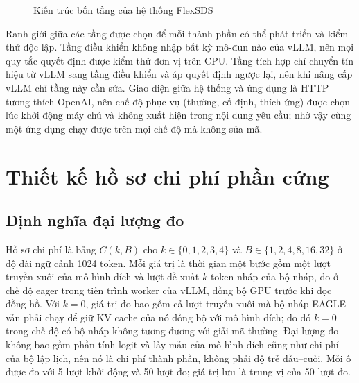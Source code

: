 \begin{figure}[htbp]
\caption{Kiến trúc bốn tầng của hệ thống FlexSDS}
\label{fig:kien-truc}
\end{figure}

Ranh giới giữa các tầng được chọn để mỗi thành phần có thể phát triển và kiểm thử độc lập. Tầng điều khiển không nhập bất kỳ mô-đun nào của vLLM, nên mọi quy tắc quyết định được kiểm thử đơn vị trên CPU. Tầng tích hợp chỉ chuyển tín hiệu từ vLLM sang tầng điều khiển và áp quyết định ngược lại, nên khi nâng cấp vLLM chỉ tầng này cần sửa. Giao diện giữa hệ thống và ứng dụng là HTTP tương thích OpenAI, nên chế độ phục vụ (thường, cố định, thích ứng) được chọn lúc khởi động máy chủ và không xuất hiện trong nội dung yêu cầu; nhờ vậy cùng một ứng dụng chạy được trên mọi chế độ mà không sửa mã.

\section{Thiết kế hồ sơ chi phí phần cứng}
\label{sec:ho-so}

\subsection{Định nghĩa đại lượng đo}

Hồ sơ chi phí là bảng $C(k, B)$ cho $k \in \{0, 1, 2, 3, 4\}$ và $B \in \{1, 2, 4, 8, 16, 32\}$ ở độ dài ngữ cảnh 1024 token. Mỗi giá trị là thời gian một bước gồm một lượt truyền xuôi của mô hình đích và lượt đề xuất $k$ token nháp của bộ nháp, đo ở chế độ eager trong tiến trình worker của vLLM, đồng bộ GPU trước khi đọc đồng hồ. Với $k=0$, giá trị đo bao gồm cả lượt truyền xuôi mà bộ nháp EAGLE vẫn phải chạy để giữ KV cache của nó đồng bộ với mô hình đích; do đó $k=0$ trong chế độ có bộ nháp không tương đương với giải mã thường. Đại lượng đo không bao gồm phần tính logit và lấy mẫu của mô hình đích cũng như chi phí của bộ lập lịch, nên nó là chi phí thành phần, không phải độ trễ đầu--cuối. Mỗi ô được đo với 5 lượt khởi động và 50 lượt đo; giá trị lưu là trung vị của 50 lượt đo.

